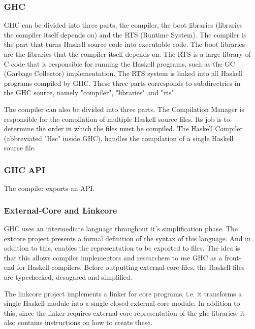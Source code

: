 \subsubsection{GHC}

GHC can be divided into three parts, the compiler, the boot libraries
(libraries the compiler itself depends on) and the RTS (Runtime System). 
The compiler is the part
that turns Haskell source code into executable code. The boot libraries are the 
libraries that the compiler itself depends on. The RTS is a large library
of C code that is responsible for running the Haskell programs, such as the 
GC (Garbage Collector) implementation. The RTS system is linked into all 
Haskell programs compiled by GHC. These three parts corresponds to subdirectries
in the GHC source, namely "compiler", "libraries" and "rts".
\cite{marlow2012glasgow}

The compiler can also be divided into three parts. The Compilation Manager is 
responsible for the compilation of multiple Haskell source files. Its job is to
determine the order in which the files must be compiled. The Haskell Compiler 
(abbreviated "Hsc" inside GHC), handles the compilation of a single Haskell source
file.


\subsubsection{GHC API}

The compiler exports an API.

\subsubsection{External-Core and Linkcore}

GHC uses an intermediate language throughout it's 
simplification phase. The extcore project presents a formal definition of the syntax 
of this language. And in addition to this, enables the representation to be exported 
to files. The idea is that this allows compiler implementors and researchers to use GHC
as a front-end for Haskell compilers. Before outputting external-core files,
the Haskell files are typechecked, desugared and simplified. \cite{tolmach2010ghc}

The linkcore project implements a linker for core programs, i.e. it transforms
a single Haskell module into a single closed external-core module. In addition to
this, since the linker requires external-core representation of the ghc-libraries,
it also contains instructions on how to create these. 

